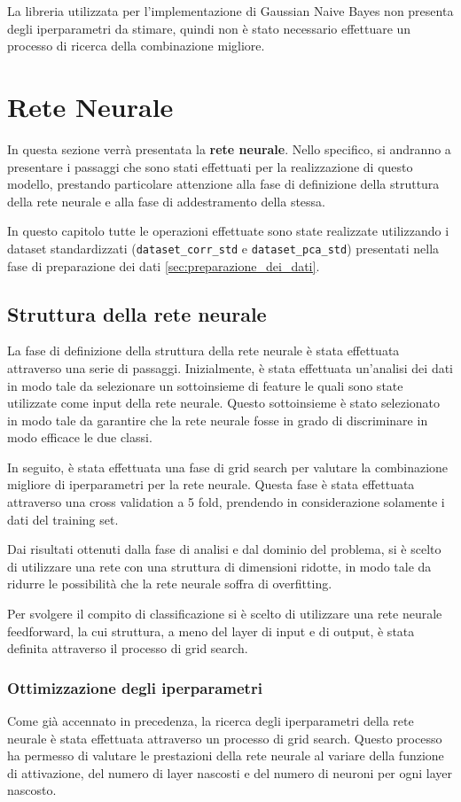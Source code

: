 La libreria utilizzata per l'implementazione di Gaussian Naive Bayes non
presenta degli iperparametri da stimare, quindi non è stato necessario effettuare
un processo di ricerca della combinazione migliore.
\section{Rete Neurale}
In questa sezione verrà presentata la \textbf{rete neurale}. Nello specifico, si
andranno a presentare i passaggi che sono stati effettuati per la realizzazione
di questo modello, prestando particolare attenzione alla fase di definizione
della struttura della rete neurale e alla fase di addestramento della stessa.

In questo capitolo tutte le operazioni effettuate sono state realizzate
utilizzando i dataset standardizzati (\texttt{dataset\_corr\_std} e
\texttt{dataset\_pca\_std}) presentati nella fase di preparazione dei
dati \ref{sec:preparazione_dei_dati}.
\subsection{Struttura della rete neurale}
La fase di definizione della struttura della rete neurale è stata effettuata
attraverso una serie di passaggi. Inizialmente, è stata effettuata un'analisi
dei dati in modo tale da selezionare un sottoinsieme di feature le quali sono
state utilizzate come input della rete neurale. Questo sottoinsieme è stato
selezionato in modo tale da garantire che la rete neurale fosse in grado di
discriminare in modo efficace le due classi.

In seguito, è stata effettuata una fase di grid search per valutare la combinazione
migliore di iperparametri per la rete neurale. Questa fase è stata effettuata
attraverso una cross validation a 5 fold, prendendo in considerazione solamente
i dati del training set.

Dai risultati ottenuti dalla fase di analisi e dal dominio del problema, si è
scelto di utilizzare una rete con una struttura di dimensioni ridotte, in modo
tale da ridurre le possibilità che la rete neurale soffra di overfitting.

Per svolgere il compito di classificazione si è scelto di utilizzare una rete
neurale feedforward, la cui struttura, a meno del layer di input e di output, è
stata definita attraverso il processo di grid search.
\subsubsection{Ottimizzazione degli iperparametri}
Come già accennato in precedenza, la ricerca degli iperparametri della rete neurale
è stata effettuata attraverso un processo di grid search. Questo processo ha
permesso di valutare le prestazioni della rete neurale al variare della funzione
di attivazione, del numero di layer nascosti e del numero di neuroni per ogni
layer nascosto.

